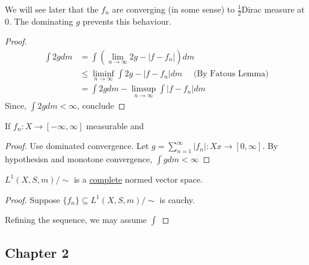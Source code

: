 We will see later that the $f_{n}$ are converging (in some sense) to $\frac{1}{2}$Dirac measure at $0$. The dominating $g$ prevents this behaviour.

\begin{proof}
	\begin{align*}
		\int 2g dm &= \int \left( \lim_{n \to \infty} 2g - | f - f_{n}| \right) dm \\
				   &\leq \liminf_{n \to \infty} \int 2g - |f - f_{n}|dm \quad \text{ (By Fatous Lemma)} \\
				   &= \int 2g dm - \limsup_{n \to \infty} \int | f - f_{n}| dm
	\end{align*} 
	Since, $\int 2gdm < \infty$, conclude
\end{proof}

\begin{corollary}
	If $f_{n} : X \to [-\infty, \infty]$ measurable and 
\end{corollary}

\begin{proof}
	Use dominated convergence. Let $g = \sum_{n=1}^{\infty} | f_n | : Xx \to [0,\infty]$. By hypothesisn and monotone convergence, $\int gdm < \infty$
\end{proof}


\begin{corollary}
	$L^{1}(X,S, m) / \sim$ is a \underline{complete} normed vector space.
\end{corollary}

\begin{proof}
	Suppose $\{f_n\} \subseteq L^{1}(X,S, m) / \sim$ is cauchy.

	Refining the sequence, we may assume $\int$
\end{proof}






\subsection{Chapter 2}


